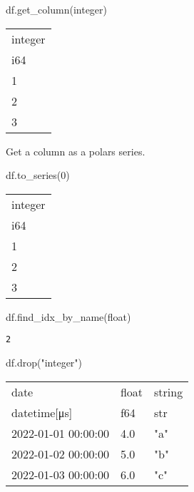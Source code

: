 \documentclass[
  letterpaper,
  DIV=11,
  numbers=noendperiod]{scrartcl}
\newenvironment{Shaded}{\begin{snugshade}}{\end{snugshade}}
\newcommand{\DecValTok}[1]{\textcolor[rgb]{0.68,0.00,0.00}{#1}}
\newcommand{\NormalTok}[1]{\textcolor[rgb]{0.00,0.23,0.31}{#1}}
\newcommand{\StringTok}[1]{\textcolor[rgb]{0.13,0.47,0.30}{#1}}
\begin{document}
\begin{Shaded}
\begin{Highlighting}[]
\NormalTok{df.get\_column(}\StringTok{\textquotesingle{}integer\textquotesingle{}}\NormalTok{)}
\end{Highlighting}
\end{Shaded}

\begin{longtable}[]{@{}l@{}}
\toprule()
integer \\
i64 \\
\midrule()
\endhead
1 \\
2 \\
3 \\
\bottomrule()
\end{longtable}

Get a column as a polars series.

\begin{Shaded}
\begin{Highlighting}[]
\NormalTok{df.to\_series(}\DecValTok{0}\NormalTok{)}
\end{Highlighting}
\end{Shaded}

\begin{longtable}[]{@{}l@{}}
\toprule()
integer \\
i64 \\
\midrule()
\endhead
1 \\
2 \\
3 \\
\bottomrule()
\end{longtable}

\begin{Shaded}
\begin{Highlighting}[]
\NormalTok{df.find\_idx\_by\_name(}\StringTok{\textquotesingle{}float\textquotesingle{}}\NormalTok{)}
\end{Highlighting}
\end{Shaded}

\begin{verbatim}
2
\end{verbatim}

\begin{Shaded}
\begin{Highlighting}[]
\NormalTok{df.drop(}\StringTok{"integer"}\NormalTok{)}
\end{Highlighting}
\end{Shaded}

\begin{longtable}[]{@{}lll@{}}
\toprule()
date & float & string \\
datetime{[}μs{]} & f64 & str \\
\midrule()
\endhead
2022-01-01 00:00:00 & 4.0 & "a" \\
2022-01-02 00:00:00 & 5.0 & "b" \\
2022-01-03 00:00:00 & 6.0 & "c" \\
\bottomrule()
\end{longtable}
\end{document}
